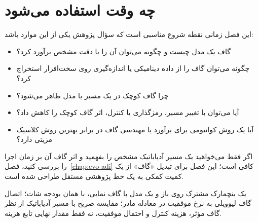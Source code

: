 \section{چه وقت استفاده می‌شود}

این فصل زمانی نقطه شروع مناسبی است که سؤال پژوهش یکی از این موارد باشد:

\begin{itemize}
	\item گاف یک مدل چیست و چگونه می‌توان آن را با دقت مشخص برآورد کرد؟
	\item چگونه می‌توان گاف را از داده دینامیکی یا اندازه‌گیری روی سخت‌افزار استخراج کرد؟
	\item چرا گاف کوچک در یک مسیر یا مدل ظاهر می‌شود؟
	\item آیا می‌توان با تغییر مسیر، رمزگذاری یا کنترل، اثر گاف کوچک را کاهش داد؟
	\item آیا یک روش کوانتومی برای برآورد یا مهندسی گاف در برابر بهترین روش کلاسیک مزیتی دارد؟
\end{itemize}

اگر فقط می‌خواهید یک مسیر آدیاباتیک مشخص را بفهمید و اثر گاف آن بر زمان اجرا را بررسی کنید، فصل~\ref{chap:evo-adi} کافی است؛ این فصل برای تبدیل «گاف» از یک کمیت کمکی به یک خط پژوهشی مستقل طراحی شده است.

\begin{remark}
	یک بنچمارک مشترک روی  باز و یک مدل با گاف نمایی، با همان بودجه شات؛ اتصال گاف لیوویلی به نرخ موفقیت در معادله مادر؛ مقایسه صریح  با مسیر آدیاباتیک از نظر گاف مؤثر، هزینه کنترل و احتمال موفقیت، نه فقط مقدار نهایی تابع هزینه.
\end{remark}
